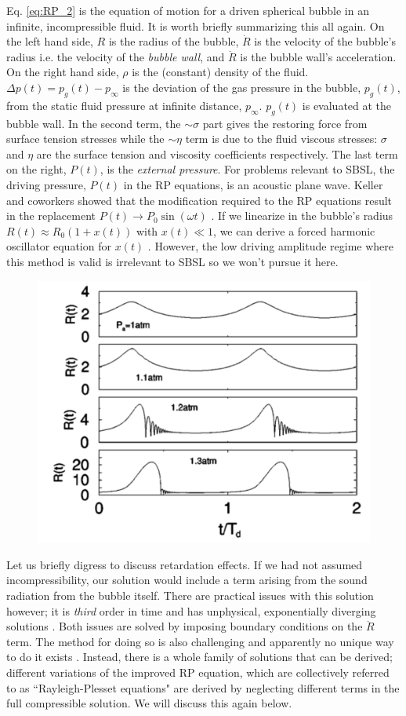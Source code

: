 \documentclass[rmp,aps,nofootinbib,superscriptaddress,floatfix]{revtex4-2}
\begin{document}
Eq. \ref{eq:RP_2} is the equation of motion for a driven spherical bubble in an infinite, incompressible fluid. It is worth briefly summarizing this all again. On the left hand side, $R$ is the radius of the bubble, $\dot{R}$ is the velocity of the bubble's radius i.e. the velocity of the \emph{bubble wall}, and $\ddot{R}$ is the bubble wall's acceleration. On the right hand side, $\rho$ is the (constant) density of the fluid. $\Delta p(t) = p_g(t)-p_\infty$ is the deviation of the gas pressure in the bubble, $p_g(t)$, from the static fluid pressure at infinite distance, $p_\infty$. $p_g(t)$ is evaluated at the bubble wall. In the second term, the $\sim \sigma$ part gives the restoring force from surface tension stresses while the $\sim \eta$ term is due to the fluid viscous stresses: $\sigma$ and $\eta$ are the surface tension and viscosity coefficients respectively. The last term on the right, $P(t)$, is the \emph{external pressure}. For problems relevant to SBSL, the driving pressure, $P(t)$ in the RP equations, is an acoustic plane wave. Keller and coworkers showed that the modification required to the RP equations result in the replacement $P(t) \rightarrow P_0 \sin(\omega t)$ \cite{keller1980bubble}. If we linearize in the bubble's radius $R(t)\approx R_0 \left( 1+x(t) \right)$ with $x(t) \ll 1$, we can derive a forced harmonic oscillator equation for $x(t)$ \cite{brennen2014cavitation,yasui2018acoustic}. However, the low driving amplitude regime where this method is valid is irrelevant to SBSL so we won't pursue it here.

\begin{figure}
\includegraphics[width=0.5\linewidth]{figs/bubble_radius_2.pdf}
    \caption{\cite{brenner2002single}}
\label{fig:bubble_radius_2}
\end{figure}

Let us briefly digress to discuss retardation effects. If we had not assumed incompressibility, our solution would include a term arising from the sound radiation from the bubble itself. There are practical issues with this solution however; it is \emph{third} order in time and has unphysical, exponentially diverging solutions \cite{prosperetti1999old,brenner2002single,prosperetti1986bubble,lezzi1987bubble}. Both issues are solved by imposing boundary conditions on the $\ddot{R}$ term. The method for doing so is also challenging and apparently no unique way to do it exists \cite{prosperetti1986bubble,prosperetti1988nonlinear,keller1956damping}. Instead, there is a whole family of solutions that can be derived; different variations of the improved RP equation, which are collectively referred to as ``Rayleigh-Plesset equations" are derived by neglecting different terms in the full compressible solution. We will discuss this again below.
\end{document}
